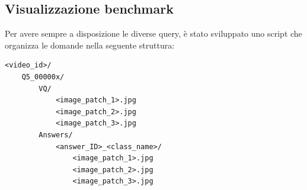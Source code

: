 \subsection*{Visualizzazione benchmark}
Per avere sempre a disposizione le diverse query, è stato sviluppato uno script che organizza le domande nella seguente struttura:

\begin{verbatim}
<video_id>/
    Q5_00000x/
        VQ/
            <image_patch_1>.jpg
            <image_patch_2>.jpg
            <image_patch_3>.jpg
        Answers/
            <answer_ID>_<class_name>/
                <image_patch_1>.jpg
                <image_patch_2>.jpg
                <image_patch_3>.jpg
\end{verbatim}